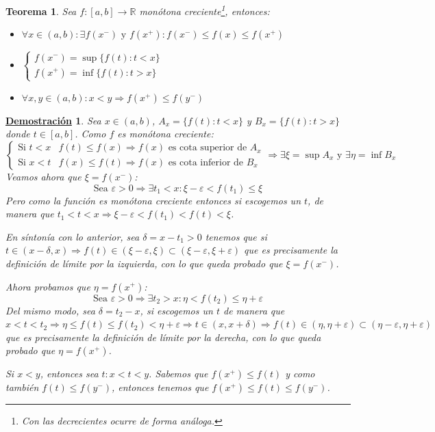 \documentclass[10pt,a4paper,openright]{book}
\theoremstyle{break}
\newtheorem{theo}{Teorema}[chapter]
\newtheorem*{demo}{\underline{Demostración}}
\begin{document}
\begin{theo}
Sea $f:[a,b]\rightarrow \mathbb R$ monótona creciente\footnote{Con las decrecientes ocurre de forma análoga.}, entonces:
\begin{itemize}
\item $\forall x\in (a,b):\exists f(x^-)\mbox{ y }f(x^+): f(x^-)\leq f(x)\leq f(x^+)$
\item $\begin{cases}f(x^-)=\sup\{f(t): t<x\} \\ f(x^+)=\inf\{f(t): t>x\}\end{cases}$
\item $\forall x,y\in (a,b): x<y\Rightarrow f(x^+)\leq f(y^-)$
\end{itemize}
\end{theo}
\begin{demo}
Sea $x\in (a,b)$, $A_x=\{f(t): t<x\}$ y $B_x=\{f(t): t>x\}$ donde $t\in [a,b]$. Como $f$ es monótona creciente:
$$\begin{cases}\mbox{Si }t< x & f(t)\leq f(x)\Rightarrow f(x)\mbox{ es cota superior de }A_x \\\mbox{Si } x<t & f(x)\leq f(t)\Rightarrow f(x)\mbox{ es cota inferior de }B_x\end{cases}\Rightarrow \exists \xi=\sup A_x\mbox{ y }\exists \eta=\inf B_x$$
Veamos ahora que $\xi=f(x^-)$:
$$\mbox{Sea }\varepsilon>0\Rightarrow \exists t_1<x: \xi-\varepsilon< f(t_1)\leq \xi$$
Pero como la función es monótona creciente entonces si escogemos un $t$, de manera que $t_1<t<x\Rightarrow \xi- \varepsilon<f(t_1)<f(t)<\xi$.

En síntonía con lo anterior, sea $\delta= x-t_1>0$ tenemos que si $t\in (x-\delta, x)\Rightarrow f(t)\in (\xi-\varepsilon, \xi)\subset (\xi-\varepsilon, \xi+ \varepsilon)$ que es precisamente la definición de límite por la izquierda, con lo que queda probado que  $\xi=f(x^-)$.

Ahora probamos que $\eta=f(x^+)$:
$$\mbox{Sea }\varepsilon>0\Rightarrow \exists t_2>x: \eta< f(t_2)\leq \eta+ \varepsilon$$
Del mismo modo, sea $\delta= t_2-x$, si escogemos un $t$ de manera que $x<t<t_2\Rightarrow \eta\leq f(t)\leq f(t_2)<\eta+ \varepsilon \Rightarrow t\in (x, x+\delta)\Rightarrow f(t)\in (\eta, \eta+\varepsilon)\subset (\eta-\varepsilon, \eta+ \varepsilon)$ que es precisamente la definición de límite por la derecha, con lo que queda probado que  $\eta=f(x^+)$.

Si $x<y$, entonces sea $t: x<t<y$. Sabemos que $f(x^+)\leq f(t)$ y como también $f(t)\leq f(y^-)$, entonces tenemos que $f(x^+)\leq f(t)\leq f(y^-)$.
\end{demo}
\end{document}
